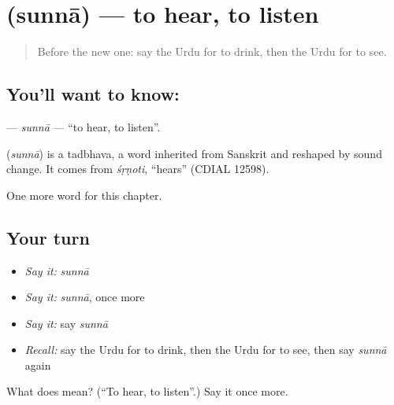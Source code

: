 \section[\texorpdfstring{\ur{سننا} (sunnā)}{سننا (sunnā)}]{ (sunnā) — to hear, to listen}

\label{lesson:UR-C46-sunna}



\begin{quote}
Before the new one: say the Urdu for to drink, then the Urdu for to see.
\end{quote}

\subsection*{You'll want to know: }
\textbf{} — \emph{sunnā} — \textquotedblleft{}to hear, to listen\textquotedblright{}.

\begin{cousinweb}
\textbf{} (\emph{sunnā}) is a tadbhava, a word inherited from Sanskrit and reshaped by sound change. It comes from \emph{śṛṇoti}, \textquotedblleft{}hears\textquotedblright{} (CDIAL 12598).
\end{cousinweb}

\begin{grammarlens}[title={What you've built}]
One more word for this chapter.
\end{grammarlens}

\subsection*{Your turn}
\begin{itemize}
\raggedright
  \item \emph{Say it:} \emph{sunnā}
  \item \emph{Say it:} \emph{sunnā}, once more
  \item \emph{Say it:} say \emph{sunnā}
  \item \emph{Recall:} say the Urdu for to drink, then the Urdu for to see, then say \emph{sunnā} again
\end{itemize}

\begin{tcolorbox}[breakable,colback=teal!4,colframe=teal!35!black,title={Before you move on}]
What does  mean? (\textquotedblleft{}To hear, to listen\textquotedblright{}.) Say it once more.
\end{tcolorbox}
